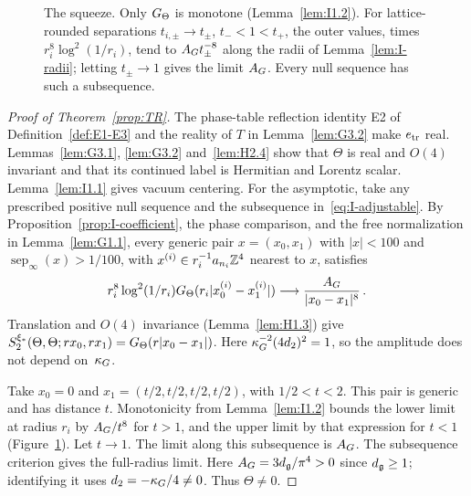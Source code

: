\begin{figure}[t]
\centering
{}
\caption{The squeeze. Only $G_{\Theta}$ is monotone (Lemma~\ref{lem:I1.2}). For lattice-rounded separations $t_{i,\pm}\to t_\pm$, $t_-<1<t_+$, the outer values, times $r_i^8\log^2(1/r_i)$, tend to $A_G t_\pm^{-8}$ along the radii of Lemma~\ref{lem:I-radii}; letting $t_\pm\to1$ gives the limit $A_G$. Every null sequence has such a subsequence.}\label{fig:I-squeeze}
\end{figure}

\begin{proof}[Proof of Theorem~\ref{prop:TR}]
The phase-table reflection identity E2 of Definition~\ref{def:E1-E3} and the reality of $T$ in Lemma~\ref{lem:G3.2} make $e_{\rm tr}$ real. Lemmas~\ref{lem:G3.1}, \ref{lem:G3.2} and~\ref{lem:H2.4} show that $\Theta$ is real and $O(4)$ invariant and that its continued label is Hermitian and Lorentz scalar. Lemma~\ref{lem:I1.1} gives vacuum centering. For the asymptotic, take any prescribed positive null sequence and the subsequence in~\eqref{eq:I-adjustable}. By Proposition~\ref{prop:I-coefficient}, the phase comparison, and the free normalization in Lemma~\ref{lem:G1.1}, every generic pair $x=(x_0,x_1)$ with $|x|<100$ and $\operatorname{sep}_\infty(x)>1/100$, with $x^{(i)}\in r_i^{-1}a_{n_i}\mathbb{Z}^4$ nearest to $x$, satisfies
\begin{equation*}
r_i^8\log^2(1/r_i)G_{\Theta}(r_i|x_0^{(i)}-x_1^{(i)}|)
\longrightarrow\frac{A_G}{|x_0-x_1|^8}\,.
\end{equation*}
Translation and $O(4)$ invariance (Lemma~\ref{lem:H1.3}) give $S_2^{\xi_*}(\Theta,\Theta;rx_0,rx_1)=G_{\Theta}(r|x_0-x_1|)$. Here $\kappa_G^{-2}(4d_2)^2=1$, so the amplitude does not depend on~$\kappa_G$.

Take $x_0=0$ and $x_1=(t/2,t/2,t/2,t/2)$, with $1/2<t<2$. This pair is generic and has distance $t$. Monotonicity from Lemma~\ref{lem:I1.2} bounds the lower limit at radius $r_i$ by $A_G/t^8$ for $t>1$, and the upper limit by that expression for $t<1$ (Figure~\ref{fig:I-squeeze}). Let $t\to1$. The limit along this subsequence is $A_G$. The subsequence criterion gives the full-radius limit. Here $A_G=3d_{\mathfrak{g}}/\pi^4>0$ since $d_{\mathfrak{g}}\ge1$; identifying it uses $d_2=-\kappa_G/4\ne0$. Thus $\Theta\ne0$.
\end{proof}

